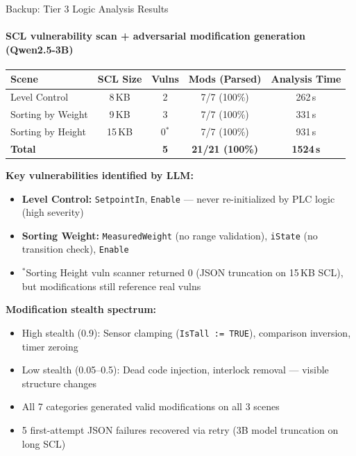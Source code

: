 \documentclass[aspectratio=169,10pt]{beamer}
\begin{document}
\begin{frame}{Backup: Tier 3 Logic Analysis Results}
\framesubtitle{SCL vulnerability scan + adversarial modification generation (Qwen2.5-3B)}

\begin{table}
\centering
\small
\begin{tabular}{@{}lcccc@{}}
\toprule
\textbf{Scene} & \textbf{SCL Size} & \textbf{Vulns} & \textbf{Mods (Parsed)} & \textbf{Analysis Time} \\
\midrule
Level Control & 8\,KB & 2 & 7/7 (100\%) & 262\,s \\
Sorting by Weight & 9\,KB & 3 & 7/7 (100\%) & 331\,s \\
Sorting by Height & 15\,KB & 0$^*$ & 7/7 (100\%) & 931\,s \\
\midrule
\textbf{Total} & & \textbf{5} & \textbf{21/21 (100\%)} & \textbf{1524\,s} \\
\bottomrule
\end{tabular}
\end{table}

\vspace{0.3em}
\textbf{Key vulnerabilities identified by LLM:}
\begin{itemize}\small
    \item \textbf{Level Control:} \texttt{SetpointIn}, \texttt{Enable} — never re-initialized by PLC logic (high severity)
    \item \textbf{Sorting Weight:} \texttt{MeasuredWeight} (no range validation), \texttt{iState} (no transition check), \texttt{Enable}
    \item $^*$Sorting Height vuln scanner returned 0 (JSON truncation on 15\,KB SCL), but modifications still reference real vulns
\end{itemize}

\vspace{0.3em}
\textbf{Modification stealth spectrum:}
\begin{itemize}\small
    \item High stealth (0.9): Sensor clamping (\texttt{IsTall := TRUE}), comparison inversion, timer zeroing
    \item Low stealth (0.05--0.5): Dead code injection, interlock removal — visible structure changes
    \item All 7 categories generated valid modifications on all 3 scenes
    \item 5 first-attempt JSON failures recovered via retry (3B model truncation on long SCL)
\end{itemize}
\end{frame}
\end{document}
